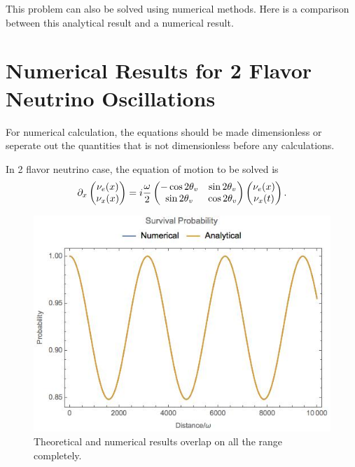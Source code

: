\documentclass[letterpaper,12pt,english]{sphinxmanual}
\begin{document}
This problem can also be solved using numerical methods. Here is a comparison between this analytical result and a numerical result.


\section{Numerical Results for 2 Flavor Neutrino Oscillations}
\label{vacuum:numerical-results-for-2-flavor-neutrino-oscillations}
For numerical calculation, the equations should be made dimensionless or seperate out the quantities that is not dimensionless before any calculations.

In 2 flavor neutrino case, the equation of motion to be solved is
\begin{gather}
\begin{split}\partial_x  \begin{pmatrix}
\nu_e(x) \\ \nu_x(x)
\end{pmatrix} = i \frac{\omega}{2} \begin{pmatrix}
-\cos 2\theta_v &    \sin 2\theta_v \\   \sin 2\theta_v & \cos 2\theta_v
\end{pmatrix} \begin{pmatrix}
\nu_e(x) \\ \nu_x(t)
\end{pmatrix}.\end{split}\notag
\end{gather}\begin{figure}[htbp]
\centering
\capstart

\includegraphics{vacuumOsc.jpg}
\caption{Theoretical and numerical results overlap on all the range completely.}\end{figure}
\end{document}

